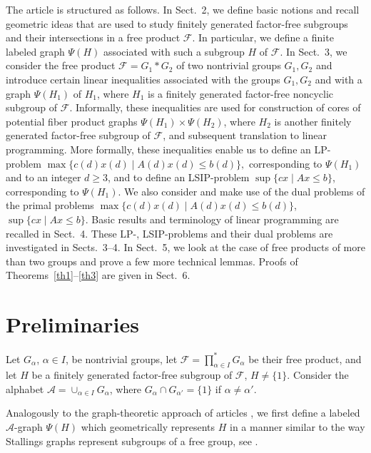 \documentclass[10pt, reqno]{amsart}
\numberwithin{equation}{section}
\begin{document}
The article is structured as follows.
In Sect.~2,  we define basic notions and recall geometric ideas that are used to study finitely generated  factor-free subgroups and their intersections in a free product ${\mathcal{F}}$. In particular, we define a finite labeled graph $\Psi(H)$ associated with such a subgroup $H$ of ${\mathcal{F}}$.  In Sect.~3, we consider the free product  ${\mathcal{F}} = G_1 * G_2$  of two nontrivial groups $G_1, G_2$ and introduce certain linear inequalities associated with the groups $ G_1, G_2 $ and with a graph $\Psi(H_1)$ of $H_1$, where $H_1$ is a finitely generated  factor-free noncyclic subgroup of ${\mathcal{F}}$.
Informally, these inequalities are used for construction of cores of potential fiber product graphs $\Psi(H_1) \times \Psi(H_2)$, where $H_2$ is another finitely generated  factor-free subgroup of ${\mathcal{F}}$, and subsequent translation to linear programming. More formally,  these inequalities enable us to define an  LP-problem
$
\max\{ c(d)x(d) \mid A(d) x(d) \le b(d) \} ,
$
corresponding to $\Psi(H_1)$ and to an integer $d \ge 3$, and to define an LSIP-problem $\sup \{ cx \mid A x \le b \}$, corresponding to $\Psi(H_1)$. We also consider and make use of the dual problems of the primal problems $\max\{ c(d)x(d) \mid A(d) x(d) \le b(d) \}$,  $\sup \{ cx \mid A x \le b \}$.  Basic results and terminology of linear programming are recalled in Sect.~4.
These LP-,  LSIP-problems and their dual problems are investigated in Sects.~3--4. In Sect.~5, we look at the  case of  free products of more than two groups and prove a few more technical lemmas. Proofs of  Theorems~\ref{th1}--\ref{th3}  are given in Sect.~6.

\section{Preliminaries}

Let $G_{\alpha}$, ${\alpha} \in I$,  be  nontrivial
groups,  let ${\mathcal{F}} = \prod_{\alpha \in I}^* G_\alpha$ be their  free product, and let $H$ be  a finitely generated factor-free subgroup of ${\mathcal{F}}$, $H \ne \{ 1\}$.
Consider the alphabet ${\mathcal{A}} = \cup_{{\alpha} \in I} G_{\alpha}$, where $G_{\alpha} \cap G_{{\alpha}'} =\{ 1\}$ if ${\alpha} \ne {\alpha}'$.

Analogously to the graph-theoretic approach of articles \cite{DIv, DIv2, Iv99, Iv01, Iv08, Iv10, Iv12},
we first define a labeled ${\mathcal{A}}$-graph $\Psi(H)$ which  geometrically represents $H$ in a manner similar  to the way Stallings  graphs represent  subgroups of a free group, see \cite{St}.
\end{document}
